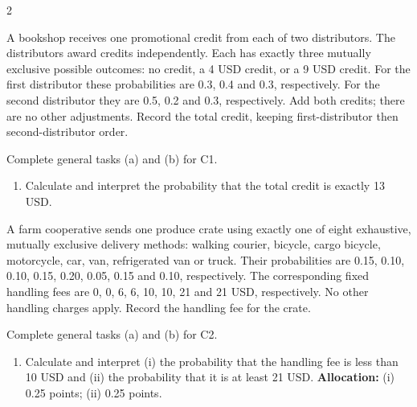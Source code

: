 \begin{multicols*}{2}
\noindent\begin{minipage}{\linewidth}
A bookshop receives one promotional credit from each of two distributors. The distributors award credits independently. Each has exactly three mutually exclusive possible outcomes: no credit, a 4 USD credit, or a 9 USD credit. For the first distributor these probabilities are 0.3, 0.4 and 0.3, respectively. For the second distributor they are 0.5, 0.2 and 0.3, respectively. Add both credits; there are no other adjustments. Record the total credit, keeping first-distributor then second-distributor order.

Complete general tasks (a)  and (b)  for C1.
\begin{enumerate}[label=(\alph*),start=3]
\item {} Calculate and interpret the probability that the total credit is exactly 13 USD.
\end{enumerate}
\end{minipage}\par\medskip

\noindent\begin{minipage}{\linewidth}
A farm cooperative sends one produce crate using exactly one of eight exhaustive, mutually exclusive delivery methods: walking courier, bicycle, cargo bicycle, motorcycle, car, van, refrigerated van or truck. Their probabilities are 0.15, 0.10, 0.10, 0.15, 0.20, 0.05, 0.15 and 0.10, respectively. The corresponding fixed handling fees are 0, 0, 6, 6, 10, 10, 21 and 21 USD, respectively. No other handling charges apply. Record the handling fee for the crate.

Complete general tasks (a)  and (b)  for C2.
\begin{enumerate}[label=(\alph*),start=3]
\item {} Calculate and interpret (i) the probability that the handling fee is less than 10 USD and (ii) the probability that it is at least 21 USD.
\textbf{Allocation:} (i) 0.25 points; (ii) 0.25 points.
\end{enumerate}
\end{minipage}\par\medskip


\end{multicols*}
